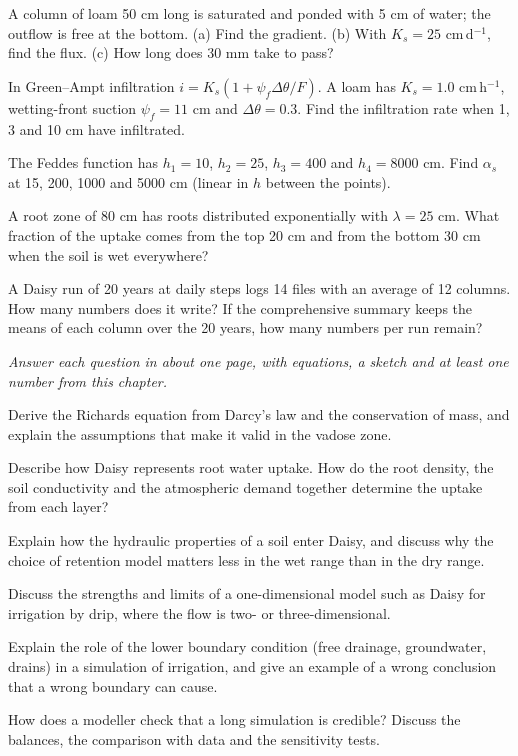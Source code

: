 \begin{exlist}
\item A column of loam 50 cm long is saturated and ponded with 5 cm of water; the outflow is free at the bottom. (a) Find the gradient. (b) With $K_s=25$ cm\,d$^{-1}$, find the flux. (c) How long does 30 mm take to pass?
\item In Green--Ampt infiltration $i=K_s(1+\psi_f\Delta\theta/F)$. A loam has $K_s=1.0$ cm\,h$^{-1}$, wetting-front suction $\psi_f=11$ cm and $\Delta\theta=0.3$. Find the infiltration rate when 1, 3 and 10 cm have infiltrated.
\item The Feddes function has $h_1=10$, $h_2=25$, $h_3=400$ and $h_4=8000$ cm. Find $\alpha_s$ at 15, 200, 1000 and 5000 cm (linear in $h$ between the points).
\item A root zone of 80 cm has roots distributed exponentially with $\lambda=25$ cm. What fraction of the uptake comes from the top 20 cm and from the bottom 30 cm when the soil is wet everywhere?
\item A Daisy run of 20 years at daily steps logs 14 files with an average of 12 columns. How many numbers does it write? If the comprehensive summary keeps the means of each column over the 20 years, how many numbers per run remain?
\end{exlist}
{\small\itshape Answer each question in about one page, with equations, a sketch and at least one number from this chapter.}\par\vspace{3pt}
\begin{exlist}
\item Derive the Richards equation from Darcy's law and the conservation of mass, and explain the assumptions that make it valid in the vadose zone.
\item Describe how Daisy represents root water uptake. How do the root density, the soil conductivity and the atmospheric demand together determine the uptake from each layer?
\item Explain how the hydraulic properties of a soil enter Daisy, and discuss why the choice of retention model matters less in the wet range than in the dry range.
\item Discuss the strengths and limits of a one-dimensional model such as Daisy for irrigation by drip, where the flow is two- or three-dimensional.
\item Explain the role of the lower boundary condition (free drainage, groundwater, drains) in a simulation of irrigation, and give an example of a wrong conclusion that a wrong boundary can cause.
\item How does a modeller check that a long simulation is credible? Discuss the balances, the comparison with data and the sensitivity tests.
\end{exlist}
